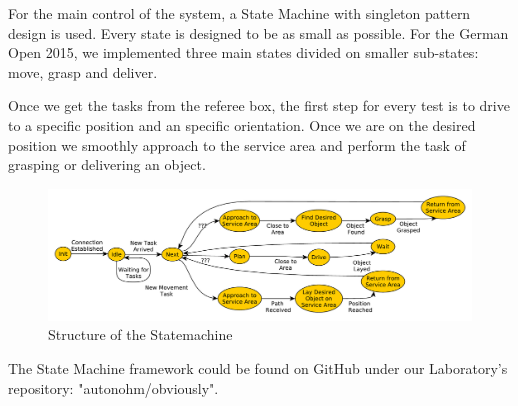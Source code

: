 For the main control of the system, a State Machine with singleton pattern design is used. Every state is designed to be as small as possible. For the German Open 2015, we implemented three main states divided on smaller sub-states: move, grasp and deliver.

Once we get the tasks from the referee box, the first step for every test is to drive to a specific position and an specific orientation. Once we are on the desired position we smoothly approach to the service area and perform the task of grasping or delivering an object. 	

\begin{figure}[htbp]
	\centering
	\includegraphics[width=\textwidth]{img/sm}
	\caption{Structure of the Statemachine}
	\label{fig:SM}
\end{figure}


The State Machine framework could be found on GitHub under our Laboratory's repository: "autonohm/obviously". 